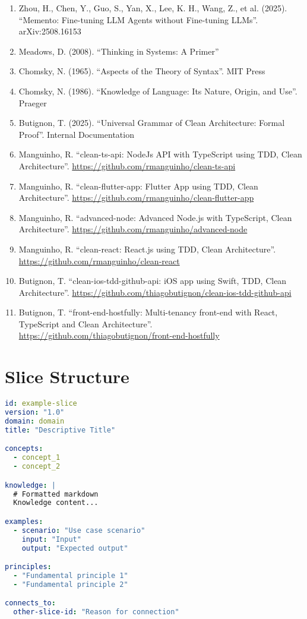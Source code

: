 \documentclass[11pt]{article}
\begin{document}
\begin{enumerate}
    \item Zhou, H., Chen, Y., Guo, S., Yan, X., Lee, K. H., Wang, Z., et al. (2025). ``Memento: Fine-tuning LLM Agents without Fine-tuning LLMs''. arXiv:2508.16153
    \item Meadows, D. (2008). ``Thinking in Systems: A Primer''
    \item Chomsky, N. (1965). ``Aspects of the Theory of Syntax''. MIT Press
    \item Chomsky, N. (1986). ``Knowledge of Language: Its Nature, Origin, and Use''. Praeger
    \item Butignon, T. (2025). ``Universal Grammar of Clean Architecture: Formal Proof''. Internal Documentation
    \item Manguinho, R. ``clean-ts-api: NodeJs API with TypeScript using TDD, Clean Architecture''. \url{https://github.com/rmanguinho/clean-ts-api}
    \item Manguinho, R. ``clean-flutter-app: Flutter App using TDD, Clean Architecture''. \url{https://github.com/rmanguinho/clean-flutter-app}
    \item Manguinho, R. ``advanced-node: Advanced Node.js with TypeScript, Clean Architecture''. \url{https://github.com/rmanguinho/advanced-node}
    \item Manguinho, R. ``clean-react: React.js using TDD, Clean Architecture''. \url{https://github.com/rmanguinho/clean-react}
    \item Butignon, T. ``clean-ios-tdd-github-api: iOS app using Swift, TDD, Clean Architecture''. \url{https://github.com/thiagobutignon/clean-ios-tdd-github-api}
    \item Butignon, T. ``front-end-hostfully: Multi-tenancy front-end with React, TypeScript and Clean Architecture''. \url{https://github.com/thiagobutignon/front-end-hostfully}
\end{enumerate}

\appendix

\section{Slice Structure}

\begin{lstlisting}[language=yaml]
id: example-slice
version: "1.0"
domain: domain
title: "Descriptive Title"

concepts:
  - concept_1
  - concept_2

knowledge: |
  # Formatted markdown
  Knowledge content...

examples:
  - scenario: "Use case scenario"
    input: "Input"
    output: "Expected output"

principles:
  - "Fundamental principle 1"
  - "Fundamental principle 2"

connects_to:
  other-slice-id: "Reason for connection"
\end{lstlisting}
\end{document}
